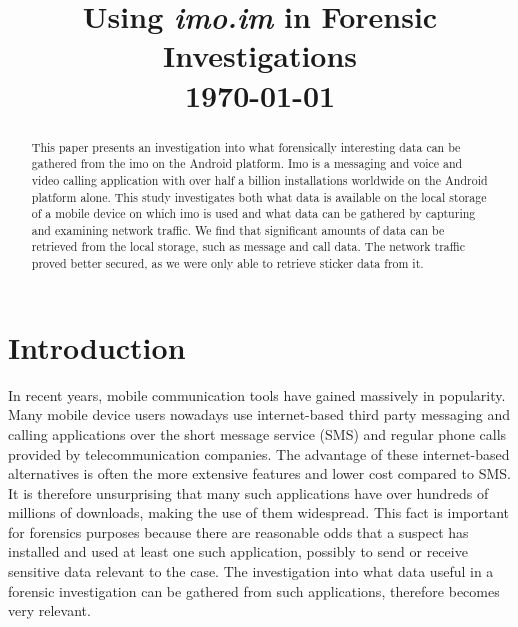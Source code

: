 \documentclass[conference]{IEEEtran}
\begin{document}
\title{Using {\it imo.im} in Forensic Investigations \\\vspace{5mm} \large  \today}
\author{
\and
{}
}
\maketitle
\thispagestyle{plain}
\pagestyle{plain}

\begin{abstract}

    This paper presents an investigation into what forensically interesting data
    can be gathered from the imo on the Android platform. Imo is a messaging and
    voice and video calling application with over half a billion installations
    worldwide on the Android platform alone. This study investigates both what
    data is available on the local storage of a mobile device on which imo is
    used and what data can be gathered by capturing and examining network
    traffic. We find that significant amounts of data can be retrieved from the
    local storage, such as message and call data. The network traffic proved
    better secured, as we were only able to retrieve sticker data from it.

\end{abstract}

\section{Introduction}

In recent years, mobile communication tools have gained massively in popularity.
Many mobile device users nowadays use internet-based third party messaging and
calling applications over the short message service (SMS) and regular phone
calls provided by telecommunication companies.  The advantage of these internet-based
alternatives is often the more extensive features and lower cost compared to SMS.
It is therefore unsurprising that many such applications have over hundreds of
millions of downloads, making the use of them widespread. This fact is important
for forensics purposes because there are reasonable odds that a suspect has
installed and used at least one such application, possibly to send or receive
sensitive data relevant to the case. The investigation into what data useful in
a forensic investigation can be gathered from such applications, therefore
becomes very relevant.
\end{document}
